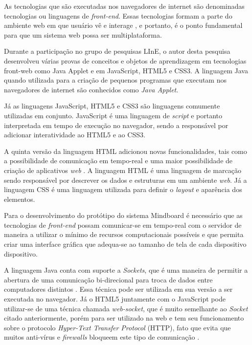 As tecnologias que são executadas nos navegadores de internet são denominadas tecnologias ou linguagens de \emph{front-end}. Essas tecnologias formam a parte do ambiente web em que usuário vê e interage \cite{treehouse}, e portanto, é o ponto fundamental para que um sistema web possa ser multiplataforma. 

Durante a participação no grupo de pesquisas LInE, o autor desta pesquisa desenvolveu várias provas de conceitos e objetos de aprendizagem em tecnologias front-web como Java Applet e em JavaScript, HTML5 e CSS3. A linguagem Java quando utilizada para a criação de pequenos programas que executam nos navegadores de internet são conhecidos como \emph{Java Applet}. 

Já as linguagens JavaScript, HTML5 e CSS3 são linguagens comumente utilizadas em conjunto. JavaScript é uma linguagem de \emph{script} e portanto interpretada em tempo de execução no navegador, sendo a responsável por adicionar interatividade ao HTML5 e ao CSS3. 

A quinta versão da linguagem HTML adicionou novas funcionalidades, tais como a possibilidade de comunicação em tempo-real e uma maior possibilidade de criação de aplicativos \emph{web} \cite{html5_intro}. A linguagem HTML é uma linguagem de marcação sendo responsável por descrever os dados e estruturas em um ambiente \emph{web}. Já a linguagem CSS é uma linguagem utilizada para definir o \emph{layout} e aparência dos elementos.

Para o desenvolvimento do protótipo do sistema Mindboard é necessário que as tecnologias de \emph{front-end} possam comunicar-se em tempo-real com o servidor de maneira a utilizar o mínimo de recursos computacionais possíveis e que permita criar uma interface gráfica que adequa-se ao tamanho de tela de cada dispositivo dispositivo.

A linguagem Java conta com suporte a \emph{Sockets}, que é uma maneira de permitir a abertura de uma comunicação bi-direcional para troca de dados entre computadores distintos \cite{sockets}. Essa técnica pode ser utilizada em sua versão a ser executada no navegador. Já o HTML5 juntamente com o JavaScript pode utilizar-se de uma técnica chamada \emph{web-socket}, que é muito semelhante ao \emph{Socket} citado anteriormente, porém para ser utilizado na web e tem seu funcionamento sobre o protocolo \emph{Hyper-Text Transfer Protocol} (HTTP), fato que evita que muitos anti-vírus e \emph{firewalls} bloqueem este tipo de comunicação \cite{websockets}.

